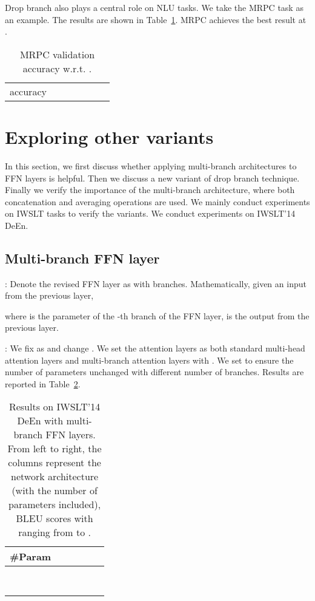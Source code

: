 \documentclass{article}
\begin{document}
Drop branch also plays a central role on NLU tasks. We take the MRPC task as an example. The results are shown in Table~\ref{tab:mrpc_rho}. MRPC achieves the best result at .

\begin{table}[!htbp]
\centering
\caption{MRPC validation accuracy w.r.t. . }
\begin{tabular}{ccccccc}
\toprule
 &  &  &  &  &   \\
\midrule
accuracy &  &  &  &  &  \\
\bottomrule
\end{tabular}
\label{tab:mrpc_rho}
\end{table}

\section{Exploring other variants}
In this section, we first discuss whether applying multi-branch architectures to FFN layers is helpful. Then we discuss a new variant of drop branch technique. Finally we verify the importance of the multi-branch architecture, where both concatenation and averaging operations are used. We mainly conduct experiments on IWSLT tasks to verify the variants. We conduct experiments on IWSLT'14 DeEn.

\subsection{Multi-branch FFN layer}
: Denote the revised FFN layer as  with  branches. Mathematically, given an input  from the previous layer,

where  is the parameter of the -th branch of the FFN layer,  is the output from the previous layer. 

: We fix  as  and change . We set the attention layers as both standard multi-head attention layers  and multi-branch attention layers with . We set  to ensure the number of parameters unchanged with different number of branches. Results are reported in Table~\ref{tab:iwslt_deen_diff_ffn_branch}.

\begin{table}[!htbp]
	\centering
	\caption{Results on IWSLT'14 DeEn with multi-branch FFN layers. From left to right, the columns represent the network architecture (with the number of parameters included), BLEU scores with  ranging from  to .}
\begin{tabular}{lccccc}
		\toprule
		\#Param &   &  &  &  \\
		\midrule
		 &  &  &  & \\
		 &  &  &  &  \\
		 &  &  &  &  \\
		 &  &  &  &  \\
		\midrule
		 &  &	 &  &	 \\
		 &  &	 &  &	 \\
		 &  &	 & &	 \\
		 &  &	 &	&	 \\
		\bottomrule
	\end{tabular}
	\label{tab:iwslt_deen_diff_ffn_branch}
\end{table}
\end{document}
